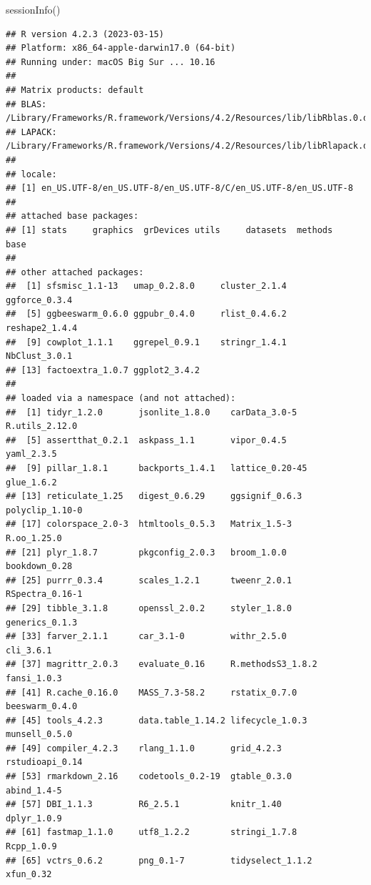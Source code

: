 \documentclass[
  11pt,
  oneside]{book}
\newenvironment{Shaded}{\begin{snugshade}}{\end{snugshade}}
\newcommand{\FunctionTok}[1]{\textcolor[rgb]{0.00,0.00,0.00}{#1}}
\newcommand{\NormalTok}[1]{#1}
\begin{document}
\begin{Shaded}
\begin{Highlighting}[]
\FunctionTok{sessionInfo}\NormalTok{()}
\end{Highlighting}
\end{Shaded}

\begin{verbatim}
## R version 4.2.3 (2023-03-15)
## Platform: x86_64-apple-darwin17.0 (64-bit)
## Running under: macOS Big Sur ... 10.16
## 
## Matrix products: default
## BLAS:   /Library/Frameworks/R.framework/Versions/4.2/Resources/lib/libRblas.0.dylib
## LAPACK: /Library/Frameworks/R.framework/Versions/4.2/Resources/lib/libRlapack.dylib
## 
## locale:
## [1] en_US.UTF-8/en_US.UTF-8/en_US.UTF-8/C/en_US.UTF-8/en_US.UTF-8
## 
## attached base packages:
## [1] stats     graphics  grDevices utils     datasets  methods   base     
## 
## other attached packages:
##  [1] sfsmisc_1.1-13   umap_0.2.8.0     cluster_2.1.4    ggforce_0.3.4   
##  [5] ggbeeswarm_0.6.0 ggpubr_0.4.0     rlist_0.4.6.2    reshape2_1.4.4  
##  [9] cowplot_1.1.1    ggrepel_0.9.1    stringr_1.4.1    NbClust_3.0.1   
## [13] factoextra_1.0.7 ggplot2_3.4.2   
## 
## loaded via a namespace (and not attached):
##  [1] tidyr_1.2.0       jsonlite_1.8.0    carData_3.0-5     R.utils_2.12.0   
##  [5] assertthat_0.2.1  askpass_1.1       vipor_0.4.5       yaml_2.3.5       
##  [9] pillar_1.8.1      backports_1.4.1   lattice_0.20-45   glue_1.6.2       
## [13] reticulate_1.25   digest_0.6.29     ggsignif_0.6.3    polyclip_1.10-0  
## [17] colorspace_2.0-3  htmltools_0.5.3   Matrix_1.5-3      R.oo_1.25.0      
## [21] plyr_1.8.7        pkgconfig_2.0.3   broom_1.0.0       bookdown_0.28    
## [25] purrr_0.3.4       scales_1.2.1      tweenr_2.0.1      RSpectra_0.16-1  
## [29] tibble_3.1.8      openssl_2.0.2     styler_1.8.0      generics_0.1.3   
## [33] farver_2.1.1      car_3.1-0         withr_2.5.0       cli_3.6.1        
## [37] magrittr_2.0.3    evaluate_0.16     R.methodsS3_1.8.2 fansi_1.0.3      
## [41] R.cache_0.16.0    MASS_7.3-58.2     rstatix_0.7.0     beeswarm_0.4.0   
## [45] tools_4.2.3       data.table_1.14.2 lifecycle_1.0.3   munsell_0.5.0    
## [49] compiler_4.2.3    rlang_1.1.0       grid_4.2.3        rstudioapi_0.14  
## [53] rmarkdown_2.16    codetools_0.2-19  gtable_0.3.0      abind_1.4-5      
## [57] DBI_1.1.3         R6_2.5.1          knitr_1.40        dplyr_1.0.9      
## [61] fastmap_1.1.0     utf8_1.2.2        stringi_1.7.8     Rcpp_1.0.9       
## [65] vctrs_0.6.2       png_0.1-7         tidyselect_1.1.2  xfun_0.32
\end{verbatim}
\end{document}
